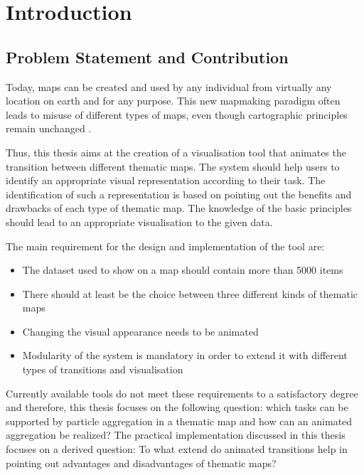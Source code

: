 \section{Introduction}


\subsection{Problem Statement and Contribution}
Today, maps can be created and used by any individual from virtually any location on earth and for any purpose. This new mapmaking paradigm often leads to misuse of different types of maps, even though cartographic principles remain unchanged .


Thus, this thesis aims at the creation of a visualisation tool that animates the transition between different thematic maps. The system should help users to identify an appropriate visual representation according to their task. The identification of such a representation is based on pointing out the benefits and drawbacks of each type of thematic map. The knowledge of the basic principles should lead to an appropriate visualisation to the given data.

The main requirement for the design and implementation of the tool are:
\begin{itemize}
\item The dataset used to show on a map should contain more than 5000 items
\item There should at least be the choice between three different kinds of thematic maps
\item Changing the visual appearance needs to be animated
\item Modularity of the system is mandatory in order to extend it with different types of transitions and visualisation
\end{itemize}
Currently available tools do not meet these requirements to a satisfactory degree and therefore, this thesis focuses on the following question:
which tasks can be supported by particle aggregation in a thematic map and how can an animated aggregation be realized? The practical implementation discussed in this thesis focuses on a derived question: To what extend do animated transitions help in pointing out advantages and disadvantages of thematic maps?

